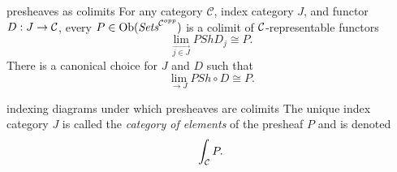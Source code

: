 \begin{frame}
\iftoggle{thmsty}{
\begin{definition}
\label{definition-category-of-elements}
}{}
\begin{block}{presheaves as colimits}
For any category $\mathcal{C}$, index category $J$, and functor $D:J \rightarrow {\mathcal C}$, every $P \in \mathop{\rm Ob}\nolimits(\textit{Sets}^{{\mathcal C}^{opp}})$ is a colimit of ${\mathcal C}$-representable functors
$$
\lim\limits_{\overrightarrow{j \in J}} PSh D_j \cong P.
$$
There is a canonical choice for $J$ and $D$ such that
$$
\lim\limits_{\rightarrow{J}} PSh \circ D \cong P.
$$
\end{block}
\begin{block}{indexing diagrams under which presheaves are colimits} 
The unique index category $J$ is called the {\it category of elements} of the presheaf $P$ and is denoted
$$
\int_{{\mathcal C}} P.
$$
\end{block}
\end{frame}
